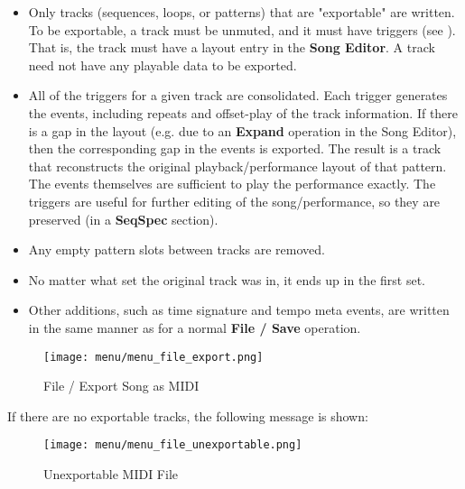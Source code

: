    \begin{itemize}
      \item Only tracks (sequences, loops, or patterns)
         that are "exportable" are written.  To be exportable, a
         track must be unmuted, and it must have triggers (see
         ).  That is,
         the track must have a layout entry in the \textbf{Song Editor}.
         A track need not have any playable data to be exported.
      \item All of the triggers for a given track are consolidated.  Each
         trigger generates the events, including repeats and
         offset-play of the track information.
         If there is a gap in the layout (e.g.
         due to an \textbf{Expand} operation in the Song Editor), then the
         corresponding gap in the events is exported. The result is
         a track that reconstructs the original
         playback/performance layout of that pattern.
         The events themselves are sufficient to play the performance exactly.
         The triggers are useful
         for further editing of the song/performance,
         so they are preserved (in a \textbf{SeqSpec} section).
      \item Any empty pattern slots between tracks are removed.
      \item No matter what set the original track was in, it ends up in the
         first set.
      \item Other additions, such as time signature and tempo meta events, are
         written in the same manner as for a normal \textbf{File / Save}
         operation.
   \end{itemize}

\begin{figure}[H]
   \centering 
   \texttt{[image: menu/menu\_file\_export.png]}
   \caption{File / Export Song as MIDI}
   \label{fig:seq64_midi_export_file_export}
\end{figure}

   If there are no exportable tracks, the following message is shown:

\begin{figure}[H]
   \centering 
   \texttt{[image: menu/menu\_file\_unexportable.png]}
   \caption{Unexportable MIDI File}
   \label{fig:seq64_midi_export_file_unexportable}
\end{figure}

